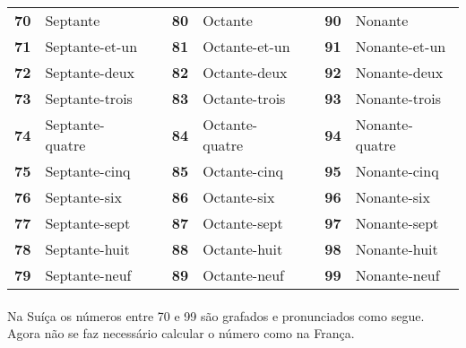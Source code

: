 \documentclass{article}
\begin{document}
            \begin{center}
                \begin{tabular}{r  l  c  r  l  c  r  l}               
                    \textbf{70} & Septante        &   & \textbf{80} & Octante        &   & \textbf{90} & Nonante\\
                    \textbf{71} & Septante-et-un  &   & \textbf{81} & Octante-et-un  &   & \textbf{91} & Nonante-et-un\\
                    \textbf{72} & Septante-deux   &   & \textbf{82} & Octante-deux   &   & \textbf{92} & Nonante-deux\\
                    \textbf{73} & Septante-trois  &   & \textbf{83} & Octante-trois  &   & \textbf{93} & Nonante-trois\\
                    \textbf{74} & Septante-quatre &   & \textbf{84} & Octante-quatre &   & \textbf{94} & Nonante-quatre\\
                    \textbf{75} & Septante-cinq   &   & \textbf{85} & Octante-cinq   &   & \textbf{95} & Nonante-cinq\\
                    \textbf{76} & Septante-six    &   & \textbf{86} & Octante-six    &   & \textbf{96} & Nonante-six\\
                    \textbf{77} & Septante-sept   &   & \textbf{87} & Octante-sept   &   & \textbf{97} & Nonante-sept\\
                    \textbf{78} & Septante-huit   &   & \textbf{88} & Octante-huit   &   & \textbf{98} & Nonante-huit\\
                    \textbf{79} & Septante-neuf   &   & \textbf{89} & Octante-neuf   &   & \textbf{99} & Nonante-neuf\\
                \end{tabular}
            \end{center} 
            
        \paragraph{}Na Suíça os números entre 70 e 99 são grafados e pronunciados como segue. Agora não se faz necessário calcular o número como na França.
            
\end{document}
